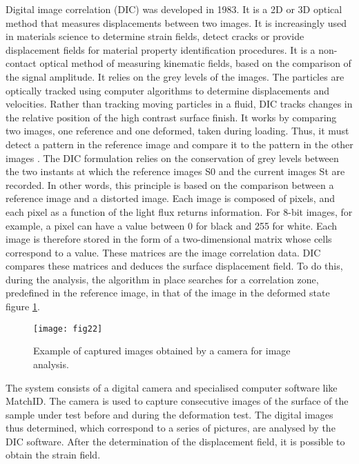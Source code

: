 Digital image correlation (DIC) was developed in 1983. It is a 2D or 3D optical method that measures displacements between two images. It is increasingly used in materials science to determine strain fields, detect cracks or provide displacement fields for material property identification procedures. It is a non-contact optical method of measuring kinematic fields, based on the comparison of the signal amplitude. It relies on the grey levels of the images. The particles are optically tracked using computer algorithms to determine displacements and velocities. Rather than tracking moving particles in a fluid, DIC tracks changes in the relative position of the high contrast surface finish. It works by comparing two images, one reference and one deformed, taken during loading. Thus, it must detect a pattern in the reference image and compare it to the pattern in the other images \cite{Mambili2018}. The DIC formulation relies on the conservation of grey levels between the two instants at which the reference images S0 and the current images St are recorded. In other words, this principle is based on the comparison between a reference image and a distorted image. Each image is composed of pixels, and each pixel as a function of the light flux returns information. For 8-bit images, for example, a pixel can have a value between 0 for black and 255 for white. Each image is therefore stored in the form of a two-dimensional matrix whose cells correspond to a value. These matrices are the image correlation data. DIC compares these matrices and deduces the surface displacement field. To do this, during the analysis, the algorithm in place searches for a correlation zone, predefined in the reference image, in that of the image in the deformed state figure \ref{fig:fig22}.


\begin{figure}[htp]
	\centering
	\texttt{[image: fig22]}
	\caption{Example of captured images obtained by a camera for image analysis.}
	\label{fig:fig22}
\end{figure}

The system consists of a digital camera and specialised computer software like MatchID. The camera is used to capture consecutive images of the surface of the sample under test before and during the deformation test. The digital images thus determined, which correspond to a series of pictures, are analysed by the DIC software. After the determination of
the displacement field, it is possible to
obtain the strain field.

